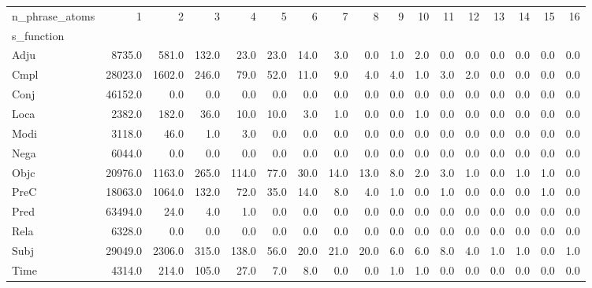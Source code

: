 \begin{tabular}{lrrrrrrrrrrrrrrrr}
\toprule
n\_phrase\_atoms &       1  &      2  &     3  &     4  &    5  &    6  &    7  &    8  &   9  &   10 &   11 &   12 &   13 &   14 &   15 &   16 \\
s\_function &          &         &        &        &       &       &       &       &      &      &      &      &      &      &      &      \\
\midrule
Adju       &   8735.0 &   581.0 &  132.0 &   23.0 &  23.0 &  14.0 &   3.0 &   0.0 &  1.0 &  2.0 &  0.0 &  0.0 &  0.0 &  0.0 &  0.0 &  0.0 \\
Cmpl       &  28023.0 &  1602.0 &  246.0 &   79.0 &  52.0 &  11.0 &   9.0 &   4.0 &  4.0 &  1.0 &  3.0 &  2.0 &  0.0 &  0.0 &  0.0 &  0.0 \\
Conj       &  46152.0 &     0.0 &    0.0 &    0.0 &   0.0 &   0.0 &   0.0 &   0.0 &  0.0 &  0.0 &  0.0 &  0.0 &  0.0 &  0.0 &  0.0 &  0.0 \\
Loca       &   2382.0 &   182.0 &   36.0 &   10.0 &  10.0 &   3.0 &   1.0 &   0.0 &  0.0 &  1.0 &  0.0 &  0.0 &  0.0 &  0.0 &  0.0 &  0.0 \\
Modi       &   3118.0 &    46.0 &    1.0 &    3.0 &   0.0 &   0.0 &   0.0 &   0.0 &  0.0 &  0.0 &  0.0 &  0.0 &  0.0 &  0.0 &  0.0 &  0.0 \\
Nega       &   6044.0 &     0.0 &    0.0 &    0.0 &   0.0 &   0.0 &   0.0 &   0.0 &  0.0 &  0.0 &  0.0 &  0.0 &  0.0 &  0.0 &  0.0 &  0.0 \\
Objc       &  20976.0 &  1163.0 &  265.0 &  114.0 &  77.0 &  30.0 &  14.0 &  13.0 &  8.0 &  2.0 &  3.0 &  1.0 &  0.0 &  1.0 &  1.0 &  0.0 \\
PreC       &  18063.0 &  1064.0 &  132.0 &   72.0 &  35.0 &  14.0 &   8.0 &   4.0 &  1.0 &  0.0 &  1.0 &  0.0 &  0.0 &  0.0 &  1.0 &  0.0 \\
Pred       &  63494.0 &    24.0 &    4.0 &    1.0 &   0.0 &   0.0 &   0.0 &   0.0 &  0.0 &  0.0 &  0.0 &  0.0 &  0.0 &  0.0 &  0.0 &  0.0 \\
Rela       &   6328.0 &     0.0 &    0.0 &    0.0 &   0.0 &   0.0 &   0.0 &   0.0 &  0.0 &  0.0 &  0.0 &  0.0 &  0.0 &  0.0 &  0.0 &  0.0 \\
Subj       &  29049.0 &  2306.0 &  315.0 &  138.0 &  56.0 &  20.0 &  21.0 &  20.0 &  6.0 &  6.0 &  8.0 &  4.0 &  1.0 &  1.0 &  0.0 &  1.0 \\
Time       &   4314.0 &   214.0 &  105.0 &   27.0 &   7.0 &   8.0 &   0.0 &   0.0 &  1.0 &  1.0 &  0.0 &  0.0 &  0.0 &  0.0 &  0.0 &  0.0 \\
\bottomrule
\end{tabular}